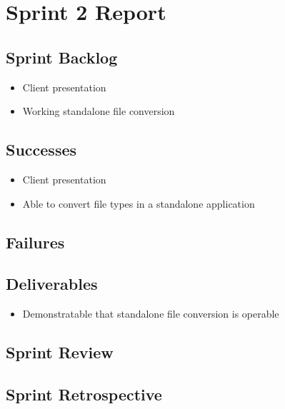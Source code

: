 
\section{Sprint 2 Report}
\label{sec:Sprint2_report}
    \subsection{Sprint Backlog}
    \label{sec:Sprint2_backlog}
    \begin{itemize}
        \item Client presentation
        \item Working standalone file conversion
    \end{itemize}

    \subsection{Successes}
    \label{sec:Sprint2_successes}
        \begin{itemize}
            \item Client presentation
            \item Able to convert file types in a standalone application
        \end{itemize}

    \subsection{Failures}
    \label{sec:Sprint2_failures}

    \subsection{Deliverables}
    \label{sec:Sprint2_deliverables}
    \begin{itemize}
        \item Demonstratable that standalone file conversion is operable
    \end{itemize}

    \subsection{Sprint Review}
    \label{sec:Sprint2_review}

    \subsection{Sprint Retrospective}
    \label{sec:Sprint2_retrospective}
